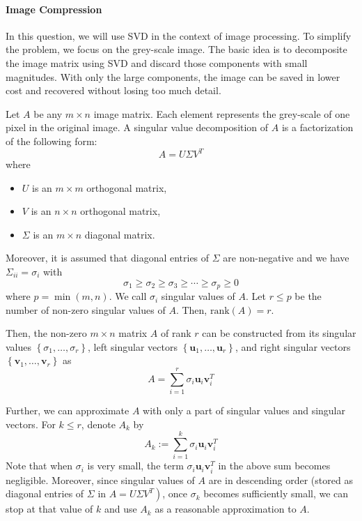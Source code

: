 \documentclass[10pt]{article}
\begin{document}
\paragraph{Image Compression} In this question, we will use SVD in the context of image processing. 
To simplify the problem, we focus on the grey-scale image. 
The basic idea is to decomposite the image matrix using SVD and discard those components with small magnitudes.
With only the large components, the image can be saved in lower cost and recovered without losing too much detail.

Let $A$ be any $m \times n$ image matrix. 
Each element represents the grey-scale of one pixel in the original image.
A singular value decomposition of $A$ is a factorization of the following form:
$$
A=U \Sigma V^{T}
$$
where

\begin{itemize}
    \item $U$ is an $m \times m$ orthogonal matrix,
    \item $V$ is an $n \times n$ orthogonal matrix,
    \item $\Sigma$ is an $m \times n$ diagonal matrix.
\end{itemize}

Moreover, it is assumed that diagonal entries of $\Sigma$ are non-negative and we have $\Sigma_{i i}=\sigma_{i}$ with
$$
\sigma_{1} \geq \sigma_{2} \geq \sigma_{3} \geq \cdots \geq \sigma_{p} \geq 0
$$
where $p=\min (m, n)$. 
We call $\sigma_{i}$ singular values of $A$. 
Let $r \leq p$ be the number of non-zero singular values of $A$. 
Then, $\text{rank}(A) = r$.

Then, the non-zero $m \times n$ matrix $A$ of rank $r$ can be constructed from its singular values $\left\{\sigma_{1}, \ldots, \sigma_{r}\right\}$, left singular vectors $\left\{\mathbf{u}_{1}, \ldots, \mathbf{u}_{r}\right\}$, and right singular vectors $\left\{\mathbf{v}_{1}, \ldots, \mathbf{v}_{r}\right\}$ as
$$
A=\sum_{i=1}^{r} \sigma_{i} \mathbf{u}_{i} \mathbf{v}_{i}^{T}
$$

Further, we can approximate $A$ with only a part of singular values and singular vectors. For $k \leq r$, denote $A_{k}$ by
$$
A_{k}:=\sum_{i=1}^{k} \sigma_{i} \mathbf{u}_{i} \mathbf{v}_{i}^{T}
$$
Note that when $\sigma_{i}$ is very small, the term $\sigma_{i} \mathbf{u}_{i} \mathbf{v}_{i}^{T}$ in the above sum becomes negligible. Moreover, since singular values of $A$ are in descending order (stored as diagonal entries of $\Sigma$ in $\left.A=U \Sigma V^{T}\right)$, once $\sigma_{k}$ becomes sufficiently small, we can stop at that value of $k$ and use $A_{k}$ as a reasonable approximation to $A$. 
\end{document}
